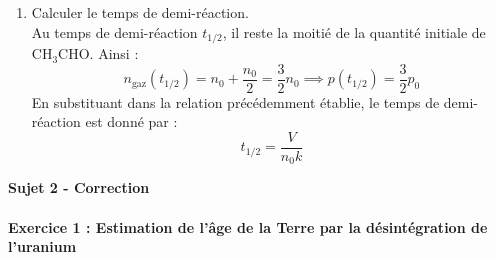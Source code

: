 \documentclass[a4paper,10pt,notitlepage,oneside]{article}
\theoremstyle{plain}
\begin{document}
\begin{enumerate}
    La vitesse d'une réaction d'ordre 2 est donnée par :
    \[
        v = -\dfrac{d[\text{CH}_3\text{CHO}]}{dt} = k[\text{CH}_3\text{CHO}]^2
    \]
    En séparant les variables et en intégrant :
    \[
        \displaystyle{\int_{n_0/V}^{(n_0 - \xi)/V}} \dfrac{d[\text{CH}_3\text{CHO}]}{[\text{CH}_3\text{CHO}]^2} = -k \displaystyle{\int_{0}^{t}} dt
    \]
    Après intégration :
    \[
        -\dfrac{1}{n_0 - \xi} + \dfrac{1}{n_0} = -kt
    \]
    Avec $n_0 = \dfrac{p_0 V}{RT}$ et $\xi = \dfrac{V}{RT}(p - p_0)$, on obtient :
    \[
        \boxed{F(t) = \dfrac{- (p - p_0)}{p - 2p_0} = -\dfrac{n_0 k t}{V}}
    \]
    Cette relation montre que la fonction $F(t)$ est bien proportionnelle au temps $t$, confirmant que l'ordre 2 est compatible.

    \item Calculer le temps de demi-réaction.\\
    
    Au temps de demi-réaction $t_{1/2}$, il reste la moitié de la quantité initiale de $\text{CH}_3\text{CHO}$. Ainsi :
    \[
        n_{\text{gaz}}(t_{1/2}) = n_0 + \dfrac{n_0}{2} = \dfrac{3}{2} n_0 \implies p(t_{1/2}) = \dfrac{3}{2} p_0
    \]
    En substituant dans la relation précédemment établie, le temps de demi-réaction est donné par :
    \[
        \boxed{t_{1/2} = \dfrac{V}{n_0 k}}
    \]
\end{enumerate}


\newpage
\begin{center}
    {\color{BlueViolet} \Large \textbf{\color{BlueViolet}Sujet 2 - Correction}}
\end{center}


\paragraph{\color{BlueViolet} Exercice 1 : Estimation de l'âge de la Terre par la désintégration de l'uranium}
\end{document}
